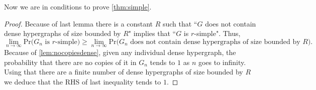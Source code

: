 \documentclass[12pt,notitlepage,a4paper]{article}
\theoremstyle{definition}
\newcommand{\Ln}{\lim\limits_{n\to \infty}}
\begin{document}
Now we are in conditions to prove \cref{thm:simple}.

\begin{proof}
	Because of last lemma there is a constant $R$ such that 
	``$G$ does not contain dense hypergraphs of size bounded by $R$" implies
	that ``$G$ is $r$-simple". Thus,
	\[ \Ln \mathrm{Pr}\big( G_n \text{ is } r \text{-simple}  \big)
	\geq \Ln \mathrm{Pr} \big( G_n \text{ does not contain dense 
	hypergraphs of size bounded by } R\big).\] 
	Because of	\cref{lem:nocopiesdense}, given any individual dense hypergraph,
	the probability that there are no copies
	of it in $G_n$ tends to $1$ as $n$ goes to infinity. Using that
	there are a finite number of dense hypergraphs of size bounded by
	$R$ we deduce that the RHS of last inequality tends to $1$. 
\end{proof}
\end{document}
